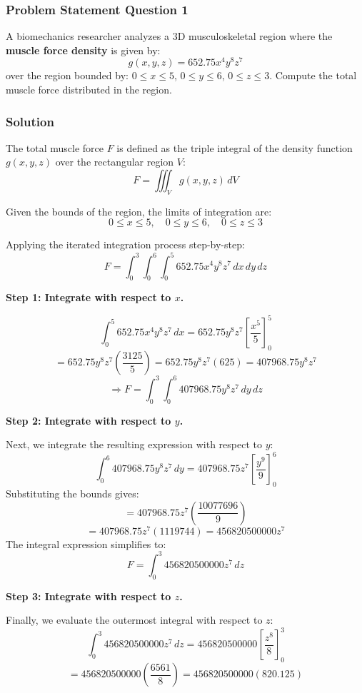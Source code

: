 \subsubsection*{Problem Statement Question 1}
A biomechanics researcher analyzes a 3D musculoskeletal region where the
\textbf{muscle force density} is given by:
\[ g(x,y,z) = 652.75x^{4}y^{8}z^{7} \]
over the region bounded by: $0 \le x \le 5$, $0 \le y \le 6$, $0 \le z \le 3$.
Compute the total muscle force distributed in the region.

\subsubsection*{Solution}
The total muscle force $F$ is defined as the triple integral of the density function $g(x, y, z)$ over the rectangular region $V$:
\[ F = \iiint_V g(x, y, z) \, dV \]

Given the bounds of the region, the limits of integration are:
\[ 0 \le x \le 5, \quad 0 \le y \le 6, \quad 0 \le z \le 3 \]

Applying the iterated integration process step-by-step:
\[ F = \int_{0}^{3} \int_{0}^{6} \int_{0}^{5} 652.75x^{4}y^{8}z^{7} \, dx \, dy \, dz \]

\vspace{1cm}
\noindent\textbf{Step 1: Integrate with respect to $x$.}

\[ \int_{0}^{5} 652.75x^{4}y^{8}z^{7} \, dx = 652.75y^{8}z^{7} \left[ \frac{x^5}{5} \right]_{0}^{5} \]
\[ = 652.75y^{8}z^{7} \left( \frac{3125}{5} \right) = 652.75y^{8}z^{7} (625) = 407968.75y^{8}z^{7} \]
\[ \Rightarrow F = \int_{0}^{3} \int_{0}^{6} 407968.75y^{8}z^{7} \, dy \, dz \]

\vspace{1cm}
\noindent\textbf{Step 2: Integrate with respect to $y$.}

Next, we integrate the resulting expression with respect to $y$:
\[ \int_{0}^{6} 407968.75y^{8}z^{7} \, dy = 407968.75z^{7} \left[ \frac{y^9}{9} \right]_{0}^{6} \]
Substituting the bounds gives:
\[ = 407968.75z^{7} \left( \frac{10077696}{9} \right) \]
\[ = 407968.75z^{7} (1119744) = 456820500000z^{7} \]
The integral expression simplifies to:
\[ F = \int_{0}^{3} 456820500000z^{7} \, dz \]

\vspace{1cm}
\noindent\textbf{Step 3: Integrate with respect to $z$.}

Finally, we evaluate the outermost integral with respect to $z$:
\[ \int_{0}^{3} 456820500000z^{7} \, dz = 456820500000 \left[ \frac{z^8}{8} \right]_{0}^{3} \]
\[ = 456820500000 \left( \frac{6561}{8} \right) = 456820500000 (820.125) \]

